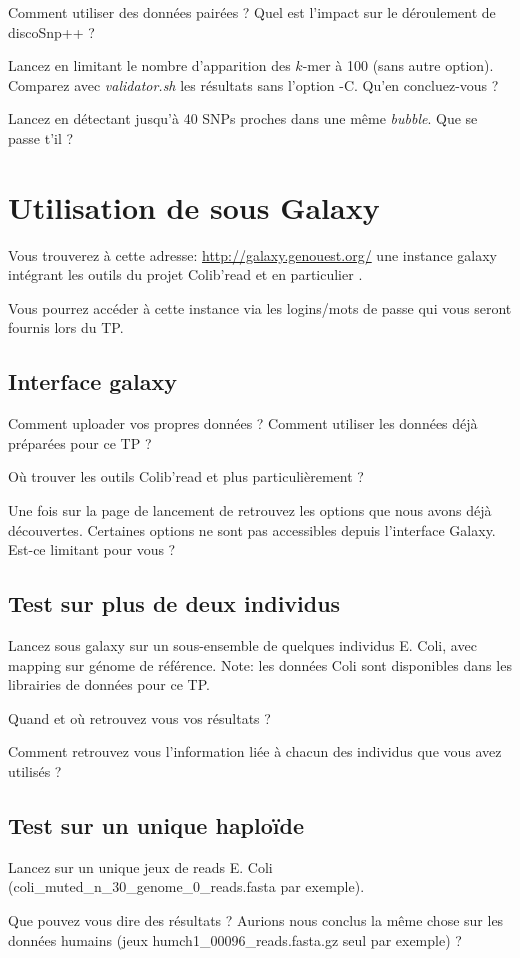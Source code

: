 \qu Comment utiliser des données pairées ? Quel est l'impact sur le déroulement de discoSnp++ ?

\qu Lancez \discopp en limitant le nombre d'apparition des $k$-mer à 100 (sans autre option). Comparez avec \emph{validator.sh} les résultats sans l'option -C. Qu'en concluez-vous ?

\qu Lancez \discopp en détectant jusqu'à 40 SNPs proches dans une même \emph{bubble}. Que se passe t'il ? 

\section*{Utilisation de \discopp sous Galaxy}
Vous trouverez à cette adresse: \url{http://galaxy.genouest.org/} une instance galaxy intégrant les outils du projet Colib'read et en particulier \discopp.

Vous pourrez accéder à cette instance via les logins/mots de passe qui vous seront fournis lors du TP. 

\subsection*{Interface galaxy}
\qu Comment uploader vos propres données ? Comment utiliser les données déjà préparées pour ce TP ?

\qu Où trouver les outils Colib'read et plus particulièrement \discopp ?

\qu Une fois sur la page de lancement de \discopp retrouvez les options que nous avons déjà découvertes. Certaines options ne sont pas accessibles depuis l'interface Galaxy. Est-ce limitant pour vous ?

\subsection*{Test sur plus de deux individus}

\qu Lancez sous galaxy \discopp sur un sous-ensemble de quelques individus E. Coli, avec mapping sur génome de référence. Note: les données Coli sont disponibles dans les librairies de données pour ce TP. 

\qu Quand et où retrouvez vous vos résultats ?

\qu Comment retrouvez vous l'information liée à chacun des individus que vous avez utilisés ? 


\subsection*{Test sur un unique haploïde}
\qu Lancez \discopp sur un unique jeux de reads E. Coli (coli\_muted\_n\_30\_genome\_0\_reads.fasta par exemple).

\qu Que pouvez vous dire des résultats ? Aurions nous conclus la même chose sur les données humains (jeux humch1\_00096\_reads.fasta.gz seul par exemple) ?





